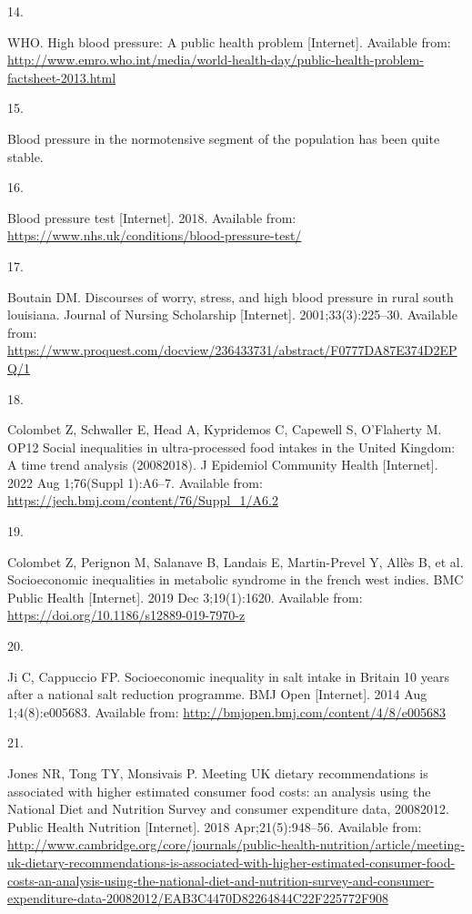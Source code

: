 \documentclass[
]{article}
\newlength{\cslhangindent}
\newlength{\csllabelwidth}
\newlength{\cslentryspacingunit} %
\newenvironment{CSLReferences}[2] %
 {%
  \setlength{\parindent}{0pt}
  \ifodd #1
  \let\oldpar\par
  \def\par{\hangindent=\cslhangindent\oldpar}
  \fi
  \setlength{\parskip}{#2\cslentryspacingunit}
 }%
 {}
\newcommand{\CSLLeftMargin}[1]{\parbox[t]{\csllabelwidth}{#1}}
\newcommand{\CSLRightInline}[1]{\parbox[t]{\linewidth - \csllabelwidth}{#1}\break}
\begin{document}
\begin{CSLReferences}{0}{0}
\leavevmode{}%
\CSLLeftMargin{14. }%
\CSLRightInline{WHO. High blood pressure: A public health problem
{[}Internet{]}. Available from:
\url{http://www.emro.who.int/media/world-health-day/public-health-problem-factsheet-2013.html}}

\leavevmode{}%
\CSLLeftMargin{15. }%
\CSLRightInline{Blood pressure in the normotensive segment of the
population has been quite stable. }

\leavevmode{}%
\CSLLeftMargin{16. }%
\CSLRightInline{Blood pressure test {[}Internet{]}. 2018. Available
from: \url{https://www.nhs.uk/conditions/blood-pressure-test/}}

\leavevmode{}%
\CSLLeftMargin{17. }%
\CSLRightInline{Boutain DM. Discourses of worry, stress, and high blood
pressure in rural south louisiana. Journal of Nursing Scholarship
{[}Internet{]}. 2001;33(3):225--30. Available from:
\url{https://www.proquest.com/docview/236433731/abstract/F0777DA87E374D2EPQ/1}}

\leavevmode{}%
\CSLLeftMargin{18. }%
\CSLRightInline{Colombet Z, Schwaller E, Head A, Kypridemos C, Capewell
S, O'Flaherty M. OP12 Social inequalities in ultra-processed food
intakes in the United Kingdom: A time trend analysis
(2008{\textendash}2018). J Epidemiol Community Health {[}Internet{]}.
2022 Aug 1;76(Suppl 1):A6--7. Available from:
\url{https://jech.bmj.com/content/76/Suppl_1/A6.2}}

\leavevmode{}%
\CSLLeftMargin{19. }%
\CSLRightInline{Colombet Z, Perignon M, Salanave B, Landais E,
Martin-Prevel Y, Allès B, et al. Socioeconomic inequalities in metabolic
syndrome in the french west indies. BMC Public Health {[}Internet{]}.
2019 Dec 3;19(1):1620. Available from:
\url{https://doi.org/10.1186/s12889-019-7970-z}}

\leavevmode{}%
\CSLLeftMargin{20. }%
\CSLRightInline{Ji C, Cappuccio FP. Socioeconomic inequality in salt
intake in Britain 10 years after a national salt reduction programme.
BMJ Open {[}Internet{]}. 2014 Aug 1;4(8):e005683. Available from:
\url{http://bmjopen.bmj.com/content/4/8/e005683}}

\leavevmode{}%
\CSLLeftMargin{21. }%
\CSLRightInline{Jones NR, Tong TY, Monsivais P. Meeting UK dietary
recommendations is associated with higher estimated consumer food costs:
an analysis using the National Diet and Nutrition Survey and consumer
expenditure data, 2008{\textendash}2012. Public Health Nutrition
{[}Internet{]}. 2018 Apr;21(5):948--56. Available from:
\url{http://www.cambridge.org/core/journals/public-health-nutrition/article/meeting-uk-dietary-recommendations-is-associated-with-higher-estimated-consumer-food-costs-an-analysis-using-the-national-diet-and-nutrition-survey-and-consumer-expenditure-data-20082012/EAB3C4470D82264844C22F225772F908}}


\end{CSLReferences}
\end{document}

